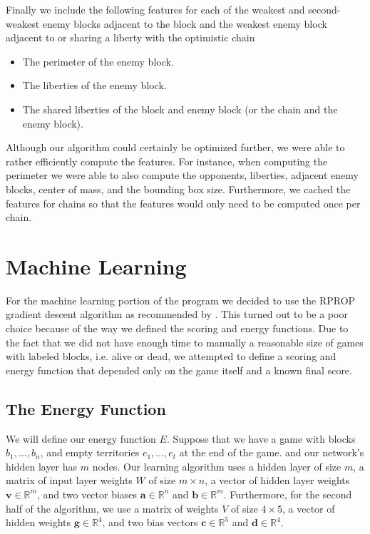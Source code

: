 \documentclass[11pt,letterpaper]{article}
\begin{document}
Finally we include the following features for each of the weakest and second-weakest enemy blocks adjacent to the block and
the weakest enemy block adjacent to or sharing a liberty with the optimistic chain
\begin{itemize}
  \item The perimeter of the enemy block.
  \item The liberties of the enemy block.
  \item The shared liberties of the block and enemy block (or the chain and the enemy block).
\end{itemize}

Although our algorithm could certainly be optimized further, we were able to rather efficiently compute the features. For instance,
when computing the perimeter we were able to also compute the opponents, liberties, adjacent enemy blocks, center of mass,
and the bounding box size. Furthermore, we cached the features for chains so that the features would only need to be computed
once per chain.

\section{Machine Learning}

For the machine learning portion of the program we decided to use the RPROP gradient descent algorithm as recommended
by \cite{vdW:04}. This turned out to be a poor choice because of the way we defined the scoring and energy functions. Due to
the fact that we did not have enough time to manually a reasonable size of games with labeled blocks, i.e. alive or dead, we
attempted to define a scoring and energy function that depended only on the game itself and a known final score.

\subsection{The Energy Function}

\def\v#1{\mathbf{#1}}
\def\touches#1#2{\mbox{tchs}_{#1}{\left(#2\right)}}
\def\color#1{\mbox{clr}{\left(#1\right)}}
\def\colorp#1{\mbox{clr}^*{\left(#1\right)}}
\def\size#1{\mbox{size}{\left(#1\right)}}

We will define our energy function $E$. Suppose that we have a game with blocks $b_1, \ldots, b_n$, and empty territories
$e_1, \ldots, e_t$ at the end of the game.  and our network's hidden layer has $m$ nodes. Our learning algorithm uses a
hidden layer of size $m$, a matrix of input layer weights $W$ of size $m \times n$, a vector of hidden layer weights
$\v{ v } \in \mathbb{ R }^m$, and two vector biases $\v{ a } \in \mathbb{ R }^n$ and $\v{ b } \in \mathbb{ R }^m$.
Furthermore, for the second half of the algorithm, we use a matrix of weights $V$ of size $4 \times 5$, a vector of hidden
weights $\v{ g } \in \mathbb{ R }^4$, and two bias vectors $\v{ c } \in \mathbb{ R }^5$ and $\v{ d } \in \mathbb{ R }^4$.
\end{document}
